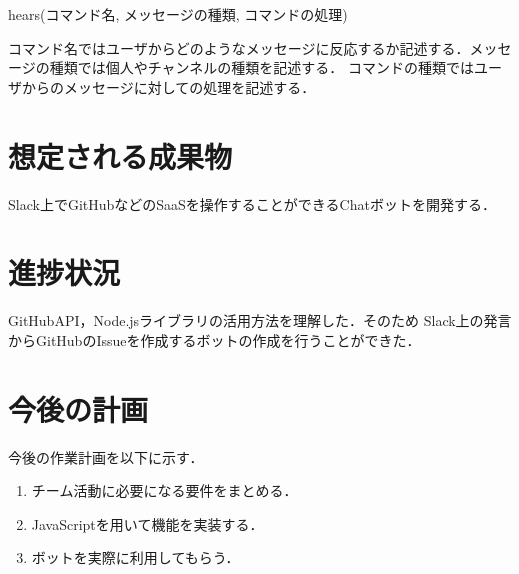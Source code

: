 \documentclass[uplatex,twocolumn,dvipdfmx]{jsarticle}
\begin{document}
hears(コマンド名, メッセージの種類, コマンドの処理)

コマンド名ではユーザからどのようなメッセージに反応するか記述する．メッセージの種類では個人やチャンネルの種類を記述する．
コマンドの種類ではユーザからのメッセージに対しての処理を記述する．






\section{想定される成果物}
Slack上でGitHubなどのSaaSを操作することができるChatボットを開発する．

\section{進捗状況}
GitHubAPI，Node.jsライブラリの活用方法を理解した．そのため
Slack上の発言からGitHubのIssueを作成するボットの作成を行うことができた．




\section{今後の計画}
今後の作業計画を以下に示す．
\begin{enumerate}
\item チーム活動に必要になる要件をまとめる．
\item JavaScriptを用いて機能を実装する．
\item ボットを実際に利用してもらう．
\end{enumerate}




\end{document}

